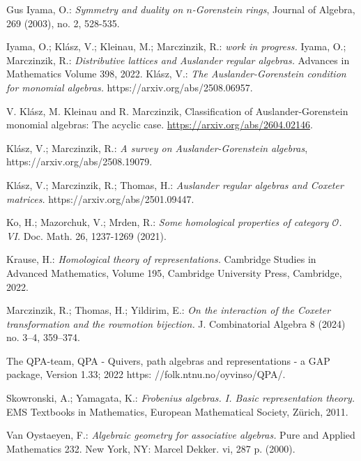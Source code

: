 \documentclass[a4paper]{amsart}
\theoremstyle{definition}
\theoremstyle{remark}
\numberwithin{equation}{section}
\begin{document}
\begin{thebibliography}{Gus}
 Iyama, O.: {\it Symmetry and duality on $n$-Gorenstein rings}, Journal of Algebra, 269 (2003), no. 2, 528-535.

Iyama, O.; Kl\'asz, V.; Kleinau, M.; Marczinzik, R.: {\it work in progress.} 
 Iyama, O.; Marczinzik, R.: {\it Distributive lattices and Auslander regular algebras.} Advances in Mathematics
Volume 398, 2022.
 Kl\'asz, V.: {\it The Auslander-Gorenstein condition for monomial algebras.} https://arxiv.org/abs/2508.06957.

 V. Kl\'asz, M. Kleinau and R. Marczinzik, Classification of Auslander-Gorenstein monomial algebras: The acyclic case. \url{https://arxiv.org/abs/2604.02146}.

Kl\'asz, V.; Marczinzik, R.: {\it A survey on Auslander-Gorenstein algebras}, https://arxiv.org/abs/2508.19079.

 Kl\'asz, V.; Marczinzik, R.; Thomas, H.: {\it Auslander regular algebras and Coxeter matrices.} https://arxiv.org/abs/2501.09447.

 Ko, H.; Mazorchuk, V.; Mrden, R.: {\it Some homological properties of category $\mathcal{O}$. VI.} Doc. Math. 26, 1237-1269 (2021).

 Krause, H.: {\it Homological theory of representations.} Cambridge Studies in Advanced Mathematics, Volume 195, Cambridge University Press, Cambridge, 2022.

 Marczinzik, R.; Thomas, H.; Yildirim, E.: {\it On the interaction of the Coxeter transformation and the rowmotion bijection.} J. Combinatorial Algebra 8 (2024) no. 3--4, 359--374.

 The QPA-team, QPA - Quivers, path algebras and representations - a GAP package, Version 1.33; 2022 https:
//folk.ntnu.no/oyvinso/QPA/. 

 Skowronski, A.; Yamagata, K.: {\it Frobenius algebras. I. Basic representation theory.} EMS Textbooks in Mathematics, European Mathematical Society, Z\"urich, 2011.

 Van Oystaeyen, F.: {\it Algebraic geometry for associative algebras.} Pure and Applied Mathematics 232. New York, NY: Marcel Dekker. vi, 287 p. (2000).
\end{thebibliography}
\end{document}
